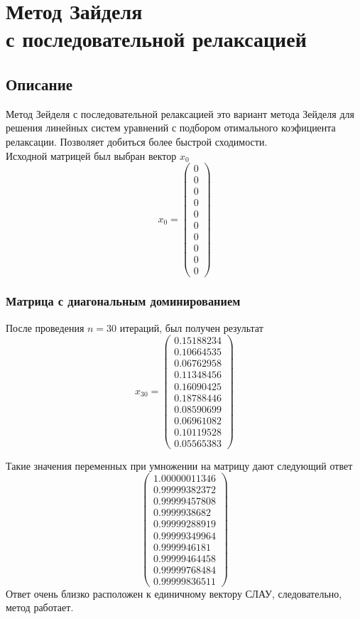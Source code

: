 \documentclass[../../report.tex]{subfiles}
\begin{document}
\chapter[Метод Зайделя с последовательной релаксацией]{\texorpdfstring{Метод Зайделя \\ 
с последовательной релаксацией}{Метод Зайделя с последовательной релаксацией}}

\section{Описание}
Метод Зейделя с последовательной релаксацией это вариант метода Зейделя для решения линейных систем уравнений с подбором отимального коэфициента релаксации. Позволяет добиться  более быстрой сходимости. \\
Исходной матрицей был выбран вектор $x_0$ 
\[
x_0 = \begin{pmatrix}
    0 \\ 
    0 \\ 
    0 \\ 
    0 \\ 
    0 \\ 
    0 \\ 
    0 \\ 
    0 \\ 
    0 \\ 
    0 
\end{pmatrix}
\]

\subsection{Матрица с диагональным доминированием}
После проведения $n=30$ итераций, был получен результат
\[
x_{30} = \begin{pmatrix}
    0.15188234 \\ 
    0.10664535 \\
    0.06762958 \\ 
    0.11348456 \\
    0.16090425 \\
    0.18788446 \\
    0.08590699 \\
    0.06961082 \\
    0.10119528 \\
    0.05565383
\end{pmatrix}
\]

Такие значения переменных при умножении на матрицу дают следующий ответ
\[
\begin{pmatrix}
    1.00000011346 \\
    0.99999382372 \\
    0.99999457808 \\
    0.9999938682 \\
    0.99999288919 \\
    0.99999349964 \\
    0.9999946181 \\
    0.99999464458 \\
    0.99999768484 \\
    0.99999836511
\end{pmatrix}
\]
Ответ очень близко расположен к единичному вектору СЛАУ, следовательно, метод работает.
\end{document}
